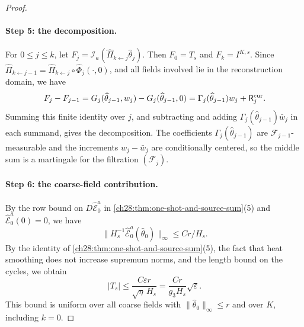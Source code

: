 \begin{proof}
\paragraph{Step 5: the decomposition.}
For $0\le j\le k$, let $F_j=\mathcal I_a(\widehat\Pi_{k\leftarrow j}\widehat\theta_j)$. Then $F_0=T_s$ and $F_k=I^{K,s}$. Since $\widehat\Pi_{k\leftarrow j-1}=\widehat\Pi_{k\leftarrow j}\circ\widehat\Phi_j(\cdot,0)$, and all fields involved lie in the reconstruction domain, we have
\[
 F_j-F_{j-1}=G_j(\widehat\theta_{j-1},w_j)-G_j(\widehat\theta_{j-1},0)=\Gamma_j(\widehat\theta_{j-1})w_j+\mathsf R_j^{\rm cur}.
\]
Summing this finite identity over $j$, and subtracting and adding $\Gamma_j(\widehat\theta_{j-1})\bar w_j$ in each summand, gives the decomposition. The coefficients $\Gamma_j(\widehat\theta_{j-1})$ are $\mathcal F_{j-1}$-measurable and the increments $w_j-\bar w_j$ are conditionally centered, so the middle sum is a martingale for the filtration $(\mathcal F_j)$.

\paragraph{Step 6: the coarse-field contribution.}
By the row bound on $D\widehat{\mathcal E}_0^a$ in \cref{ch28:thm:one-shot-and-source-sum}(5) and $\widehat{\mathcal E}_0^a(0)=0$, we have
\[
 \|H_s^{-1}\widehat{\mathcal E}_0^a(\widehat\theta_0)\|_\infty\le Cr/H_s.
\]
By the identity of \cref{ch28:thm:one-shot-and-source-sum}(5), the fact that heat smoothing does not increase supremum norms, and the length bound on the cycles, we obtain
\begin{equation}\label{ch28:eq:fixed-coarse-top}
 |T_s|\le\frac{C\varepsilon r}{\sqrt\eta\,H_s}=\frac{Cr}{g_3H_s}\sqrt\varepsilon.
\end{equation}
This bound is uniform over all coarse fields with $\|\widehat\theta_0\|_\infty\le r$ and over $K$, including $k=0$.


\end{proof}
